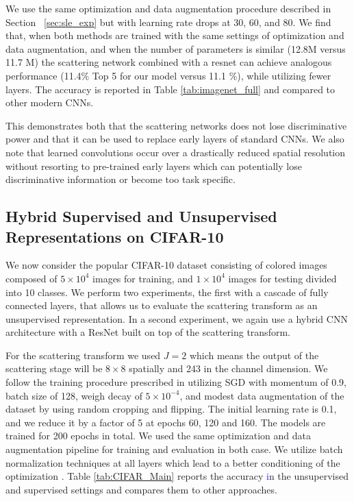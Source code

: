 \documentclass[10pt,twocolumn,letterpaper]{article}
\newcommand{\citep}{\cite}
\begin{document}
We use the same optimization and data augmentation procedure described in Section ~\ref{sec:sle_exp} but with learning rate drops at 30, 60, and 80. We find that, when both methods are trained with the same settings of optimization and data augmentation, and when the number of parameters is similar (12.8M versus 11.7 M) the scattering network combined with a resnet can achieve analogous performance (11.4$\%$ Top 5 for our model versus 11.1 $\%$), while utilizing fewer layers. The accuracy is reported in Table \ref{tab:imagenet_full} and compared to other modern CNNs. 

This demonstrates both that the scattering networks does not lose discriminative power and that it can be used to replace early layers of standard CNNs. We also note that learned convolutions occur over a drastically reduced spatial resolution without resorting to pre-trained early layers which can potentially lose discriminative information or become too task specific. 

\subsection{Hybrid Supervised and Unsupervised Representations on CIFAR-10}
\label{cifar10}
We now consider the popular CIFAR-10 dataset consisting of colored images composed of $5\times10^4$ images for training, and $1\times10^4$ images for testing divided into 10 classes. We perform two experiments, the first with a cascade of fully connected layers, that allows us to evaluate the scattering transform as an unsupervised representation. In a second experiment, we again use a hybrid CNN architecture with a ResNet built on top of the  scattering transform. 

For the scattering transform we used $J=2$ which means the output of the scattering stage will be $8\times8$ spatially and 243 in the channel dimension.  We follow the training procedure prescribed in \cite{zagoruyko2016wide} utilizing SGD with momentum of 0.9, batch size of 128, weigh decay of $5\times10^{-4}$, and modest data augmentation of the dataset by using random cropping and flipping. The initial learning rate is 0.1, and we reduce it by a factor of 5 at epochs 60, 120 and 160. The models are trained for 200 epochs in total. We used the same optimization and data augmentation pipeline for training and evaluation in both case. We utilize batch normalization techniques at all layers which lead to a better conditioning of the optimization \citep{ioffe2015batch}. Table \ref{tab:CIFAR_Main} reports the accuracy \textcolor{blue} in the unsupervised and supervised settings and compares them to other approaches.  
\end{document}
